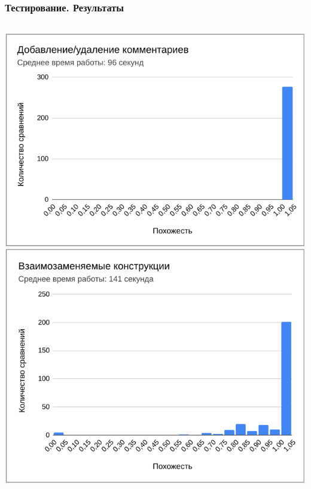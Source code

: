 \documentclass[10pt]{beamer}
\begin{document}
\begin{frame}\frametitle{Тестирование. Результаты}
	\begin{columns}
	\centering
	\includegraphics[scale=0.52]{res.png}
	

\end{columns}
\end{frame}
\end{document}
